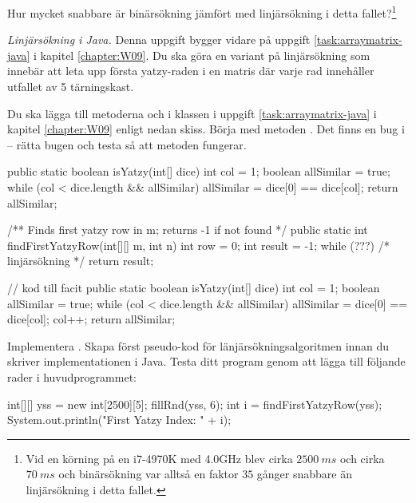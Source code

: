 \Subtask Hur mycket snabbare är binärsökning jämfört med linjärsökning i detta fallet?\footnote{Vid en körning på en i7-4970K med 4.0GHz blev  cirka $2500~ms$ och  cirka $70~ms$ och binärsökning var alltså en faktor $35$ gånger snabbare än linjärsökning i detta fallet.}





\Task \emph{Linjärsökning i Java.} Denna uppgift bygger vidare på uppgift \ref{task:arraymatrix-java} i kapitel \ref{chapter:W09}. Du ska göra en variant på linjärsökning som innebär att leta upp första yatzy-raden i en matris där varje rad innehåller utfallet av 5 tärningskast. 

\Subtask Du ska lägga till metoderna  och  i klassen  i uppgift \ref{task:arraymatrix-java} i kapitel \ref{chapter:W09} enligt nedan skiss. Börja med metoden  . Det finns en bug i  -- rätta bugen och testa så att metoden fungerar. 

\begin{Code}[language=Java]
    public static boolean isYatzy(int[] dice){
        int col = 1;
        boolean allSimilar = true;
        while (col < dice.length && allSimilar) {
          allSimilar = dice[0] == dice[col];
        }
        return allSimilar;
    }
    
    /** Finds first yatzy row in m; returns -1 if not found */
    public static int findFirstYatzyRow(int[][] m, int n){
        int row = 0;
        int result = -1;
        while (???) {
             /* linjärsökning  */ 
        }
        return result;
    }
\end{Code}


\begin{Code}[language=Java]
// kod till facit
    public static boolean isYatzy(int[] dice){
        int col = 1;
        boolean allSimilar = true;
        while (col < dice.length && allSimilar) {
          allSimilar = dice[0] == dice[col];
          col++;
        }
        return allSimilar;
    }
\end{Code}


\Subtask Implementera . Skapa först pseudo-kod för länjärsökningsalgoritmen innan du skriver implementationen i Java. 
Testa ditt program genom att lägga till följande rader i huvudprogrammet:
\begin{Code}[language=Java]
        int[][] yss = new int[2500][5];
        fillRnd(yss, 6);
        int i = findFirstYatzyRow(yss);
        System.out.println("First Yatzy Index: " + i);
\end{Code}




